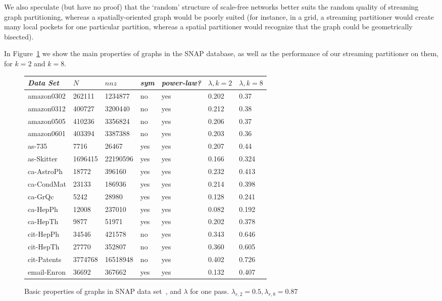 \documentclass[11pt]{article}
\begin{document}
We also speculate (but have no proof) that the `random' structure of scale-free networks better suits the random quality of streaming graph partitioning, whereas a spatially-oriented graph would be poorly suited (for instance, in a grid, a streaming partitioner would create many local pockets for one particular partition, whereas a spatial partitioner would recognize that the graph could be geometrically bisected). 

In Figure~\ref{table:big} we show the main properties of graphs in the SNAP database, as well as the performance of our streaming partitioner on them, for $k=2$ and $k=8$. 

\begin{figure}
\caption{Basic properties of graphs in SNAP data set~\cite{Leskovec-data}, and $\lambda$ for one pass. $\lambda_{r,2}=0.5,\lambda_{r,8}=0.87$}
\centering
{ \begin{tabular}{ *7l }    \toprule
\label{table:big}
\emph{Data Set} & $N$ & $nnz$ & \emph{sym} & \emph{power-law?} & $\lambda, k=2$ & $\lambda, k=8$ \\\midrule 
amazon0302 & 262111 & 1234877 & no & yes & 0.202&0.37\\ 
amazon0312 & 400727 & 3200440 & no & yes & 0.212&0.38\\ 
amazon0505 & 410236 & 3356824 & no & yes & 0.206&0.37\\ 
amazon0601 & 403394 & 3387388 & no & yes & 0.203&0.36\\ 
as-735 & 7716 & 26467 & yes & yes & 0.207&0.44\\ 
as-Skitter & 1696415 & 22190596 & yes & yes & 0.166&0.324\\ 
ca-AstroPh & 18772 & 396160 & yes & yes & 0.232&0.413\\ 
ca-CondMat & 23133 & 186936 & yes & yes & 0.214&0.398\\ 
ca-GrQc & 5242 & 28980 & yes & yes & 0.128&0.241\\ 
ca-HepPh & 12008 & 237010 & yes & yes & 0.082&0.192\\ 
ca-HepTh & 9877 & 51971 & yes & yes & 0.202&0.378\\ 
cit-HepPh & 34546 & 421578 & no & yes & 0.343&0.646\\ 
cit-HepTh & 27770 & 352807 & no & yes & 0.360&0.605\\ 
cit-Patents & 3774768 & 16518948 & no & yes & 0.402&0.726\\ 
email-Enron & 36692 & 367662 & yes & yes & 0.132&0.407\\ 

\end{tabular}}
\end{figure}
\end{document}
